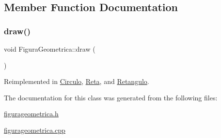 \subsection{Member Function Documentation}
\mbox{\label{class_figura_geometrica_a417090ea2019fc1d58cdb345167aebea}} 
\subsubsection{\texorpdfstring{draw()}{draw()}}
{\footnotesize\ttfamily void Figura\+Geometrica\+::draw (\begin{DoxyParamCaption}{ }\end{DoxyParamCaption})\hspace{0.3cm}{\ttfamily [virtual]}}



Reimplemented in \hyperlink{class_circulo_aa94899872fb6c586d1343df1d9ce0d86}{Circulo}, \hyperlink{class_reta_a1c370279480f421bf617e5fbfbbb63a1}{Reta}, and \hyperlink{class_retangulo_a48cb75fe7cd048727879c25485976444}{Retangulo}.



The documentation for this class was generated from the following files\+:\begin{DoxyCompactItemize}
\item 
\hyperlink{figurageometrica_8h}{figurageometrica.\+h}\item 
\hyperlink{figurageometrica_8cpp}{figurageometrica.\+cpp}\end{DoxyCompactItemize}
